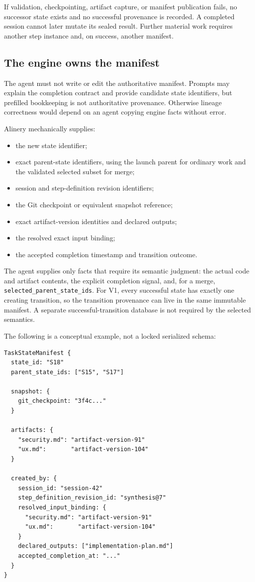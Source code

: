 \documentclass[11pt]{article}
\begin{document}
If validation, checkpointing, artifact capture, or manifest publication fails, no successor state exists and no successful provenance is recorded. A completed session cannot later mutate its sealed result. Further material work requires another step instance and, on success, another manifest.

\subsection{The engine owns the manifest}

The agent must not write or edit the authoritative manifest. Prompts may explain the completion contract and provide candidate state identifiers, but prefilled bookkeeping is not authoritative provenance. Otherwise lineage correctness would depend on an agent copying engine facts without error.

Alinery mechanically supplies:

\begin{itemize}
  \item the new state identifier;
  \item exact parent-state identifiers, using the launch parent for ordinary work and the validated selected subset for merge;
  \item session and step-definition revision identifiers;
  \item the Git checkpoint or equivalent snapshot reference;
  \item exact artifact-version identities and declared outputs;
  \item the resolved exact input binding;
  \item the accepted completion timestamp and transition outcome.
\end{itemize}

The agent supplies only facts that require its semantic judgment: the actual code and artifact contents, the explicit completion signal, and, for a merge, \texttt{selected\_parent\_state\_ids}. For V1, every successful state has exactly one creating transition, so the transition provenance can live in the same immutable manifest. A separate successful-transition database is not required by the selected semantics.

\Needspace{3.6in}
The following is a conceptual example, not a locked serialized schema:

\begin{lstlisting}[style=playbook]
TaskStateManifest {
  state_id: "S18"
  parent_state_ids: ["S15", "S17"]

  snapshot: {
    git_checkpoint: "3f4c..."
  }

  artifacts: {
    "security.md": "artifact-version-91"
    "ux.md":       "artifact-version-104"
  }

  created_by: {
    session_id: "session-42"
    step_definition_revision_id: "synthesis@7"
    resolved_input_binding: {
      "security.md": "artifact-version-91"
      "ux.md":       "artifact-version-104"
    }
    declared_outputs: ["implementation-plan.md"]
    accepted_completion_at: "..."
  }
}
\end{lstlisting}
\end{document}
